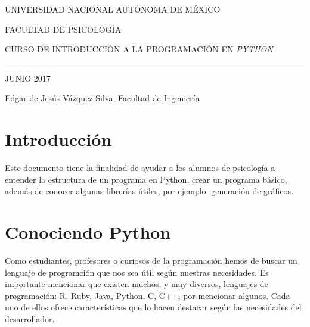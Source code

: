 \documentclass[a4paper, openright, 12pt]{article}
\author{Grupo de trabajo PAPIME}
\date{MAYO 2017}
\begin{document}
\begin{titlepage}

    \begin{center}
        \vspace{-1in}
        \vspace{0.35in}

        \begin{large}
            UNIVERSIDAD NACIONAL AUTÓNOMA DE MÉXICO
            \vspace{0.70in}

            FACULTAD DE PSICOLOGÍA
            \vspace{0.90in}

            CURSO DE INTRODUCCIÓN A LA PROGRAMACIÓN EN
            \textit{PYTHON}

            \vspace{4.0in}
            \rule{110mm}{0.02mm}


            \vspace{0.25in}
            JUNIO 2017

            \vspace{0.20in}
            Edgar de Jesús Vázquez Silva, Facultad de Ingeniería


        \end{large}


    \end{center}

\end{titlepage}


\tableofcontents
\newpage{}


  \section{Introducción}
    Este documento tiene la finalidad de ayudar a los alumnos de psicología a entender la estructura de un programa en Python, crear un programa básico, además de conocer algunas librerías útiles, por ejemplo: generación de gráficos.

  \newpage{}


  \section{Conociendo Python}
    Como estudiantes, profesores o curiosos de la programación hemos de buscar un lenguaje de programción que nos sea útil según nuestras necesidades. Es importante mencionar que existen muchos, y muy diversos, lenguajes de programación: R, Ruby, Java, Python, C, C++, por mencionar algunos. Cada uno de ellos ofrece características que lo hacen destacar según las necesidades del desarrollador.\\
\end{document}
